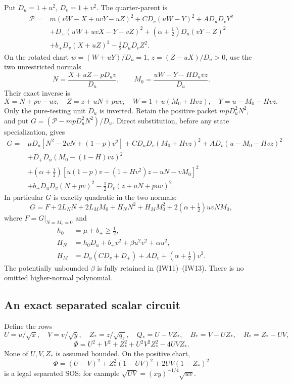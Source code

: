 Put $D_u=1+u^2$, $D_v=1+v^2$. The quarter-parent is
\[
\begin{split}
 \mathcal P={}&m(vW-X+uvY-uZ)^2+CD_v(uW-Y)^2+AD_uD_vY^2\\
 &+D_+(uW+uvX-Y-vZ)^2
 +(\alpha+\tfrac12)D_u(vY-Z)^2\\
 &+b_+D_v(X+uZ)^2-\tfrac12D_uD_vZ^2.
\end{split}                                                     \tag{IW9}
\]
On the rotated chart
$w=(W+uY)/D_u=1$, $z=(Z-uX)/D_u>0$, use the two unrestricted normals
\[
 N=\frac{X+uZ-pD_uv}{D_u},\qquad
 M_0=\frac{uW-Y-HD_uvz}{D_u}.
\]
Their exact inverse is
\[
 X=N+pv-uz,\quad Z=z+uN+puv,\quad
 W=1+u(M_0+Hvz),\quad Y=u-M_0-Hvz.                     \tag{IW10}
\]
Only the pure-testing unit $D_u$ is inverted. Retain the positive
packet $mpD_u^2N^2$, and put $G=(\mathcal P-mpD_u^2N^2)/D_u$.
Direct substitution, before any state specialization, gives
\[
\begin{split}
 G={}&\mu D_u[N^2-2vN+(1-p)v^2]
      +CD_uD_v(M_0+Hvz)^2+A D_v(u-M_0-Hvz)^2\\
 &+D_+D_u(M_0-(1-H)vz)^2\\
 &+(\alpha+\tfrac12)
       [u(1-p)v-(1+Hv^2)z-uN-vM_0]^2\\
 &+b_+D_uD_v(N+pv)^2-\tfrac12D_v(z+uN+puv)^2.
\end{split}                                                     \tag{IW11}
\]
In particular $G$ is exactly quadratic in the two normals:
\[
 G=F+2L_NN+2L_MM_0+H_NN^2+H_MM_0^2
                         +2(\alpha+\tfrac12)uvNM_0,
                                                               \tag{IW12}
\]
where $F=G|_{N=M_0=0}$ and
\[
\begin{split}
 h_0&=\mu+b_+\geq\tfrac12,\\
 H_N&=h_0D_u+b_+v^2+\beta u^2v^2+\alpha u^2,\\
 H_M&=D_u(CD_v+D_+)+AD_v+(\alpha+\tfrac12)v^2.
\end{split}                                                     \tag{IW13}
\]
The potentially unbounded $\beta$ is fully retained in (IW11)--(IW13).
There is no omitted higher-normal polynomial.

\subsection{An exact separated scalar circuit}

Define the rows
\[
 U=u/\sqrt x,\quad V=v/\sqrt y,\quad Z_*=z/\sqrt{q_z},
 \quad Q_*=U-VZ_*,\quad B_*=V-UZ_*,\quad R_*=Z_*-UV,
\]
\[
 \Phi=U^2+V^2+Z_*^2+U^2V^2Z_*^2-4UVZ_*.
\]
None of $U,V,Z_*$ is assumed bounded. On the positive chart,
\[
 \Phi=(U-V)^2+Z_*^2(1-UV)^2+2UV(1-Z_*)^2             \tag{IW14}
\]
is a legal separated SOS; for example
$\sqrt{UV}=(xy)^{-1/4}\sqrt{uv}$.

